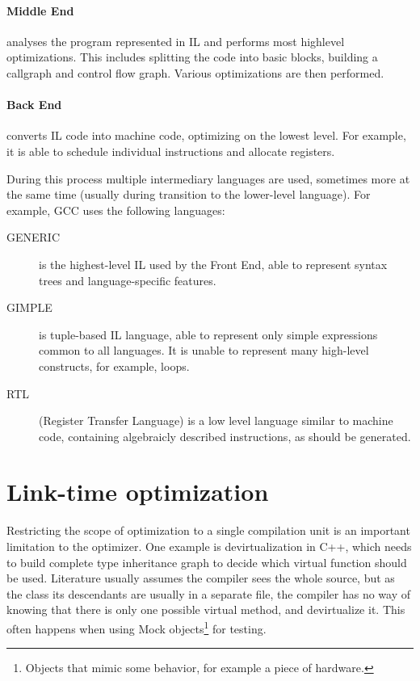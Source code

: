 \paragraph{Middle End} analyses the program represented in IL and performs most
highlevel optimizations. This includes splitting the code into basic blocks,
building a callgraph and control flow graph. Various optimizations are then
performed.

\paragraph{Back End} converts IL code into machine code, optimizing on the
lowest level. For example, it is able to schedule individual instructions and
allocate registers.

\bigskip

During this process multiple intermediary languages are used, sometimes more at
the same time (usually during transition to the lower-level language). For
example, GCC uses the following languages:

\begin{description}
	\item[GENERIC] is the highest-level IL used by the Front End, able to
		represent syntax trees and language-specific features.
	\item[GIMPLE] is tuple-based IL language, able to represent only simple
		expressions common to all languages. It is unable to represent many
		high-level constructs, for example, loops.
	\item[RTL] (Register Transfer Language) is a low level language similar to
		machine code, containing algebraicly described instructions, as should
		be generated.
\end{description}


\section{Link-time optimization}

Restricting the scope of optimization to a single compilation unit is an
important limitation to the optimizer. One example is devirtualization in C++,
which needs to build complete type inheritance graph to decide which virtual
function should be used. Literature usually assumes the compiler sees the whole
source, but as the class its descendants are usually in a separate
file, the compiler has no way of knowing that there is only one possible virtual
method, and devirtualize it.  This often happens when using Mock
objects\footnote{Objects that mimic some behavior, for example a piece of
hardware.} for testing.

